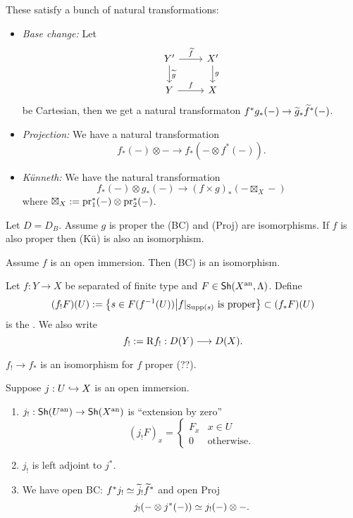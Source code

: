 These satisfy a bunch of natural transformations:
\begin{itemize}
	\item \emph{Base change:} Let
		\[
		\begin{tikzcd}
			Y' \ar[r,"\wt{f}"] \ar[d,"\wt{g}"] & X' \ar[d,"g"] \\ Y \ar[r,"f"] & X
		\end{tikzcd}
		\] 
		be Cartesian, then we get a natural transformaton $f^{*}g_*(-)\to \wt{g}_*\wt{f}^{*}(-)$.
	\item \emph{Projection:} We have a natural transformation
		\[
		f_*(-)\otimes - \to f_*(-\otimes f^{*}(-)).
		\] 
	\item \emph{K\"unneth:} We have the natural transformation
		\[
		f_*(-)\otimes g_*(-) \to (f\times g)_*(-\boxtimes_X -)
		\] 
		where $\boxtimes_X:= \operatorname{pr}_1^{*}(-)\otimes \operatorname{pr}_2^{*}(-)$.
\end{itemize}
\begin{theorem}
	Let $D=D_B$. Assume $g$ is proper the (BC) and (Proj) are isomorphisms. If $f$ is also proper then (K\"u) is also an isomorphism.
\end{theorem}
\begin{proposition}
	Assume $f$ is an open immersion. Then (BC) is an isomorphism.
\end{proposition}
\begin{definition}
	Let $f:Y\to X$ be separated of finite type and $F\in \mathsf{Sh}(X^\text{an},\Lambda)$. Define
	\[
		(f_!F)(U) := \left\{ s\in F(f^{-1}(U)) \middle| f|_{\operatorname{Supp}(s)}\text{ is proper} \right\} \subset (f_*F)(U)
	\] 
	is the . We also write
	\[
	f_! \defeq \RD f_!:D(Y)\to D(X).
	\] 
\end{definition}
$f_!\to f_*$ is an isomorphism for $f$ proper (??).
\begin{lemma}
	Suppose $j:U\hookrightarrow X$ is an open immersion.
	\begin{enumerate}[1)]
		\item $j_!:\Sh(U\an)\to \Sh(X\an)$ is ``extension by zero''
			\[
				(j_!F)_x = \begin{cases}
					F_x  & x\in U \\
					0 & \text{otherwise}.
				\end{cases}
			\] 
		\item $j_!$ is left adjoint to $j^{*}$.
		\item We have open BC: $f^{*}j_!\simeq \widetilde{j}_!\widetilde{f}^{*}$ and open Proj
			\[
			j_!(-\otimes j^{*}(-)) \simeq j_!(-) \otimes -.
			\] 
	\end{enumerate}
\end{lemma}
